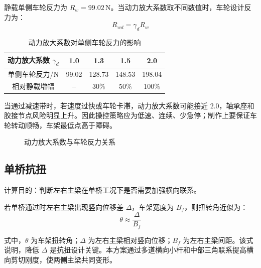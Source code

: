 \documentclass[UTF8,a4paper,12pt,fontset=none]{ctexart}
\numberwithin{equation}{section}
\numberwithin{figure}{section}
\numberwithin{table}{section}
\newcommand{\Nunit}{\,\mathrm{N}}
\begin{document}
静载单侧车轮反力为 $R_w=99.02\Nunit$。当动力放大系数取不同数值时，车轮设计反力为：
\begin{equation}
  R_{wd}=\gamma_d R_w
\end{equation}

\begin{table}[H]
\centering
\caption{动力放大系数对单侧车轮反力的影响}
\label{tab:dynamic-reaction}
\begin{tabular}{c c c c c}
\toprule
动力放大系数 $\gamma_d$ & 1.0 & 1.3 & 1.5 & 2.0 \\
\midrule
单侧车轮反力/N & 99.02 & 128.73 & 148.53 & 198.04 \\
相对静载增幅 & -- & 30\% & 50\% & 100\% \\
\bottomrule
\end{tabular}
\end{table}

当通过减速带时，若速度过快或车轮卡滞，动力放大系数可能接近 $2.0$，轴承座和胶接节点风险明显上升。因此操控策略应为低速、连续、少急停；制作上要保证车轮转动顺畅，车架最低点高于障碍。

\begin{figure}[H]
\centering
{}
\caption{动力放大系数与车轮反力关系}
\label{fig:dynamic-reaction}
\end{figure}

\subsection{单桥抗扭}
计算目的：判断左右主梁在单桥工况下是否需要加强横向联系。

若单桥通过时左右主梁出现竖向位移差 $\Delta$，车架宽度为 $B_f$，则扭转角近似为：
\begin{equation}
  \theta\approx\frac{\Delta}{B_f}
\end{equation}

式中，$\theta$ 为车架扭转角；$\Delta$ 为左右主梁相对竖向位移；$B_f$ 为左右主梁间距。该式说明，降低 $\Delta$ 是抗扭设计关键。本方案通过多道横向小杆和中部三角联系提高横向剪切刚度，使两侧主梁共同变形。
\end{document}
